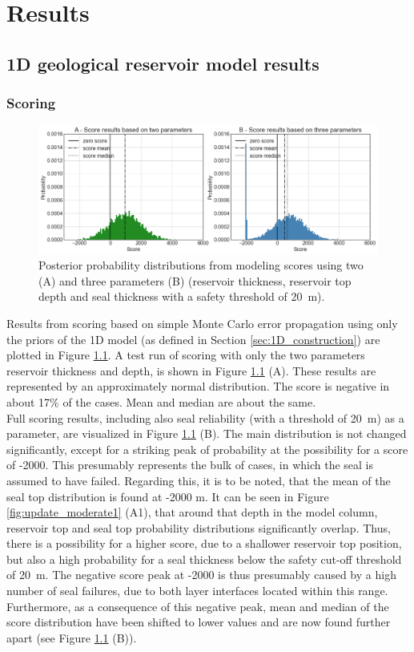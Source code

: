 	\chapter{Results}\label{cha:results}
	
		\section{1D geological reservoir model results}
	
			\subsection{Scoring}
			\begin{figure}[h]
				\centering
				\includegraphics[width=1\textwidth]{Figures/score_results1.png}
				\caption{Posterior probability distributions from modeling scores using two (A) and three parameters (B) (reservoir thickness, reservoir top depth and seal thickness with a safety threshold of 20~m).}\label{fig:score_results1}
			\end{figure}
			Results from scoring based on simple Monte Carlo error propagation using only the priors of the 1D model (as defined in Section \ref{sec:1D_construction}) are plotted in Figure \ref{fig:score_results1}. A test run of scoring with only the two parameters reservoir thickness and depth, is shown in Figure \ref{fig:score_results1} (A). These results are represented by an approximately normal distribution. The score is negative in about 17\% of the cases. Mean and median are about the same.\\	
			Full scoring results, including also seal reliability (with a threshold of 20~m) as a parameter, are visualized in Figure \ref{fig:score_results1} (B). The main distribution is not changed significantly, except for a striking peak of probability at the possibility for a score of -2000. This presumably represents the bulk of cases, in which the seal is assumed to have failed. Regarding this, it is to be noted, that the mean of the seal top distribution is found at -2000 m. It can be seen in Figure \ref{fig:update_moderate1} (A1), that around that depth in the model column, reservoir top and seal top probability distributions significantly overlap. Thus, there is a possibility for a higher score, due to a shallower reservoir top position, but also a high probability for a seal thickness below the safety cut-off threshold of 20~m. The negative score peak at -2000 is thus presumably caused by a high number of seal failures, due to both layer interfaces located within this range. Furthermore, as a consequence of this negative peak, mean and median of the score distribution have been shifted to lower values and are now found further apart (see Figure \ref{fig:score_results1} (B)).\\
